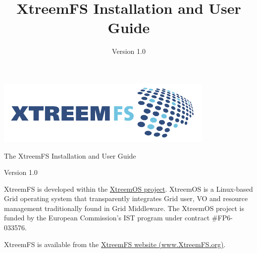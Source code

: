\documentclass[a4paper,10pt]{book}
\title{XtreemFS Installation and User Guide}
\date{Version 1.0}
\begin{document}
\begin{titlepage}
\begin{flushright}
 \includegraphics{images/final_logo.pdf}
\end{flushright}

\vspace{3cm}

\begin{flushleft}
\sffamily \begin{LARGE}The XtreemFS Installation and User Guide\end{LARGE}

Version 1.0
\end{flushleft}


\end{titlepage}
\garamond
{}

XtreemFS is developed within the \href{http://www.xtreemos.eu}{XtreemOS project}. XtreemOS is a Linux-based Grid operating system that transparently integrates Grid user, VO and resource management traditionally found in Grid Middleware. The XtreemOS project is funded by the European Commission's IST program under contract \#FP6-033576.

XtreemFS is available from the \href{http://www.XtreemFS.org}{XtreemFS website (www.XtreemFS.org)}.
\end{document}
